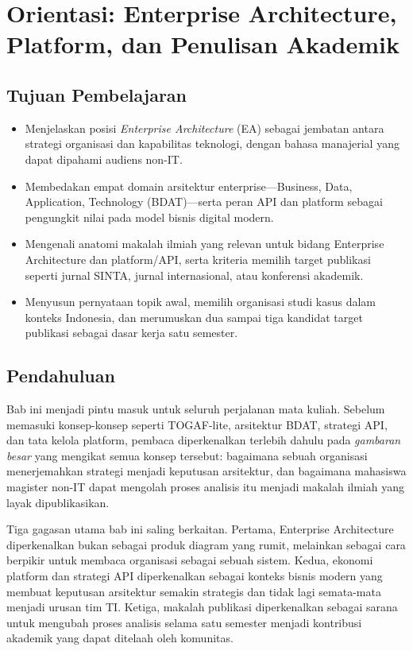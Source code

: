 \chapter{Orientasi: Enterprise Architecture, Platform, dan Penulisan Akademik}
\label{ch:orientasi}

\section*{Tujuan Pembelajaran}
\begin{itemize}
  \item Menjelaskan posisi \emph{Enterprise Architecture} (EA) sebagai jembatan
        antara strategi organisasi dan kapabilitas teknologi, dengan bahasa
        manajerial yang dapat dipahami audiens non-IT.
  \item Membedakan empat domain arsitektur enterprise---Business, Data,
        Application, Technology (BDAT)---serta peran API dan platform sebagai
        pengungkit nilai pada model bisnis digital modern.
  \item Mengenali anatomi makalah ilmiah yang relevan untuk bidang Enterprise
        Architecture dan platform/API, serta kriteria memilih target publikasi
        seperti jurnal SINTA, jurnal internasional, atau konferensi akademik.
  \item Menyusun pernyataan topik awal, memilih organisasi studi kasus dalam
        konteks Indonesia, dan merumuskan dua sampai tiga kandidat target
        publikasi sebagai dasar kerja satu semester.
\end{itemize}

\section{Pendahuluan}

Bab ini menjadi pintu masuk untuk seluruh perjalanan mata kuliah. Sebelum
memasuki konsep-konsep seperti TOGAF-lite, arsitektur BDAT, strategi API, dan
tata kelola platform, pembaca diperkenalkan terlebih dahulu pada
\emph{gambaran besar} yang mengikat semua konsep tersebut: bagaimana sebuah
organisasi menerjemahkan strategi menjadi keputusan arsitektur, dan bagaimana
mahasiswa magister non-IT dapat mengolah proses analisis itu menjadi makalah
ilmiah yang layak dipublikasikan.

Tiga gagasan utama bab ini saling berkaitan. Pertama, Enterprise Architecture
diperkenalkan bukan sebagai produk diagram yang rumit, melainkan sebagai cara
berpikir untuk membaca organisasi sebagai sebuah sistem. Kedua, ekonomi
platform dan strategi API diperkenalkan sebagai konteks bisnis modern yang
membuat keputusan arsitektur semakin strategis dan tidak lagi semata-mata
menjadi urusan tim TI. Ketiga, makalah publikasi diperkenalkan sebagai sarana
untuk mengubah proses analisis selama satu semester menjadi kontribusi
akademik yang dapat ditelaah oleh komunitas.

